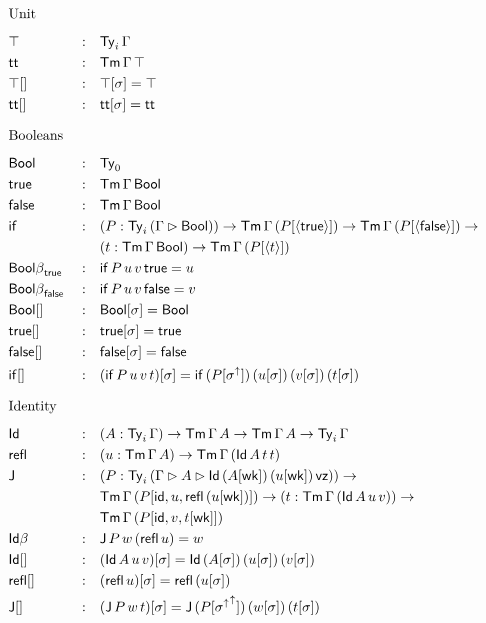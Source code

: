 \documentclass{article}
\begin{document}
\begin{alignat*}{5}
  & \heading{Unit} \\
  & \top && : && \Ty_i\,\Gamma \\
  & \tt && : && \Tm\,\Gamma\,\top \\
  & {\top[]} && : && \top[\sigma] = \top \\
  & {\tt[]} && : && \tt[\sigma] = \tt \\
  & \heading{Booleans} \\
  & \Bool && : && \Ty_0 \\
  & \true && : && \Tm\,\Gamma\,\Bool \\
  & \false && : && \Tm\,\Gamma\,\Bool \\
  & \IF && : && (P:\Ty_i\,(\Gamma\rhd\Bool))\ra\Tm\,\Gamma\,(P[\lb\true\rb])\ra\Tm\,\Gamma\,(P[\lb\false\rb])\ra \\
  & && && (t:\Tm\,\Gamma\,\Bool)\ra\Tm\,\Gamma\,(P[\lb t\rb]) \\
  & {\Bool\beta}_\true && : && \IF\,P\,u\,v\,\true = u \\
  & {\Bool\beta}_\false && : && \IF\,P\,u\,v\,\false = v \\
  & {\Bool[]} && : && \Bool[\sigma] = \Bool \\
  & {\true[]} && : && \true[\sigma] = \true \\
  & {\false[]} && : && \false[\sigma] = \false \\
  & {\IF[]} && : && (\IF\,P\,u\,v\,t)[\sigma] = \IF\,(P[\sigma^\uparrow])\,(u[\sigma])\,(v[\sigma])\,(t[\sigma]) \\
  & \heading{Identity} \\
  & \Id && : && (A:\Ty_i\,\Gamma)\ra\Tm\,\Gamma\,A\ra\Tm\,\Gamma\,A\ra\Ty_i\,\Gamma \\
  & \refl && : && (u : \Tm\,\Gamma\,A) \ra \Tm\,\Gamma\,(\Id\,A\,t\,t) \\
  & \J && : && (P : \Ty_i\,(\Gamma\rhd A\rhd \Id\,(A[\wk])\,(u[\wk])\,\vz))\ra \\
  & && && \Tm\,\Gamma\,(P[\id,u,\refl\,(u[\wk])])\ra(t:\Tm\,\Gamma\,(\Id\,A\,u\,v))\ra \\
  & && && \Tm\,\Gamma\,(P[\id,v,t[\wk]]) \\
  & {\Id\beta} && : && \J\,P\,w\,(\refl\,u) = w \\
  & {\Id[]} && : && (\Id\,A\,u\,v)[\sigma] = \Id\,(A[\sigma])\,(u[\sigma])\,(v[\sigma]) \\
  & {\refl[]} && : && (\refl\,u)[\sigma] = \refl\,(u[\sigma]) \\
  & {\J[]} && : && (\J\,P\,w\,t)[\sigma] = \J\,(P[{\sigma^\uparrow}^\uparrow])\,(w[\sigma])\,(t[\sigma]) \\
\end{alignat*}
\end{document}
